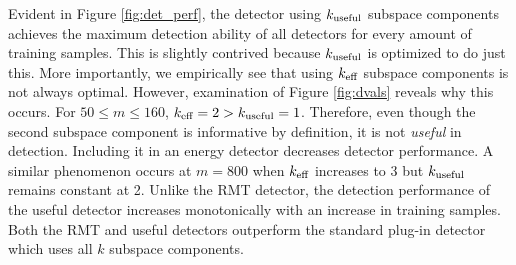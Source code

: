 Evident in Figure \ref{fig:det_perf}, the detector using $k_{\text{useful}}$ subspace components
achieves the maximum detection ability of all detectors for every amount of training
samples. This is slightly contrived because $k_{\text{useful}}$ is optimized to do just this. More
importantly, we empirically see that using $k_\text{eff}$ subspace components is not always
optimal.  However, examination of Figure \ref{fig:dvals} reveals why this occurs. For
$50\leq m\leq 160$, $k_\text{eff}=2>k_{\text{useful}}=1$. Therefore, even though the second subspace
component is informative by definition, it is not \textit{useful} in detection. Including
it in an energy detector decreases detector performance. A similar phenomenon
occurs at $m=800$ when $k_\text{eff}$ increases to 3 but $k_{\text{useful}}$ remains constant at 2. Unlike
the RMT detector, the detection performance of the useful detector increases monotonically
with an increase in training samples. Both the RMT and useful detectors outperform the
standard plug-in detector which uses all $k$ subspace components.
